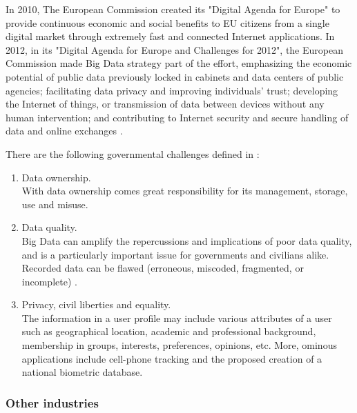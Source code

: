 \documentclass[runningheads]{llncs}
\begin{document}
In 2010, The European Commission created its "Digital Agenda for Europe" to provide continuous economic and
social benefits to EU citizens from a single digital market through extremely fast and connected Internet applications. In 2012, in its "Digital Agenda for Europe and Challenges for 2012", the European Commission made Big Data strategy part of the effort, emphasizing the economic potential of public data previously locked in cabinets and data centers of public agencies; facilitating data privacy and improving individuals' trust; developing the Internet of things, or transmission of data between devices without any human intervention; and contributing to Internet security and secure handling of data and online exchanges \cite{ACM}.

There are the following governmental challenges defined in \cite{MORABITO}:

\begin{enumerate}

\item Data ownership.\\

With data ownership comes great responsibility for its management, storage, use and misuse.\\

\item Data quality.\\

Big Data can amplify the repercussions and implications of poor data quality, and is a particularly important issue for governments and civilians alike. Recorded data can be flawed (erroneous, miscoded, fragmented, or incomplete) \cite{MORABITO}.\\

\item Privacy, civil liberties and equality.\\

The information in a user profile may include various attributes of a user such as geographical location, academic and professional background, membership in groups, interests, preferences, opinions, etc. More, ominous applications include cell-phone tracking and the proposed creation of a national biometric database.

\end{enumerate}

\subsubsection{Other industries}
\end{document}
